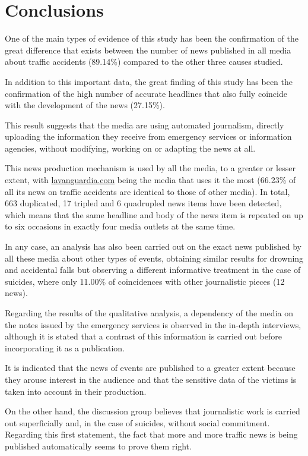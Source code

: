 \section{Conclusions}\label{sec-conclusions}

One of the main types of evidence of this study has been the
confirmation of the great difference that exists between the number of
news published in all media about traffic accidents (89.14\%) compared
to the other three causes studied.

In addition to this important data, the great finding of this study has
been the confirmation of the high number of accurate headlines that also
fully coincide with the development of the news (27.15\%).

This result suggests that the media are using automated journalism,
directly uploading the information they receive from emergency services
or information agencies, without modifying, working on or adapting the
news at all.

This news production mechanism is used by all the media, to a greater or
lesser extent, with \url{lavanguardia.com} being the media that uses it
the most (66.23\% of all its news on traffic accidents are identical to
those of other media). In total, 663 duplicated, 17 tripled and 6
quadrupled news items have been detected, which means that the same
headline and body of the news item is repeated on up to six occasions in
exactly four media outlets at the same time.

In any case, an analysis has also been carried out on the exact news
published by all these media about other types of events, obtaining
similar results for drowning and accidental falls but observing a
different informative treatment in the case of suicides, where only
11.00\% of coincidences with other journalistic pieces (12 news).

Regarding the results of the qualitative analysis, a dependency of the
media on the notes issued by the emergency services is observed in the
in-depth interviews, although it is stated that a contrast of this
information is carried out before incorporating it as a publication.

It is indicated that the news of events are published to a greater
extent because they arouse interest in the audience and that the
sensitive data of the victims is taken into account in their production.

On the other hand, the discussion group believes that journalistic work
is carried out superficially and, in the case of suicides, without
social commitment. Regarding this first statement, the fact that more
and more traffic news is being published automatically seems to prove
them right.

